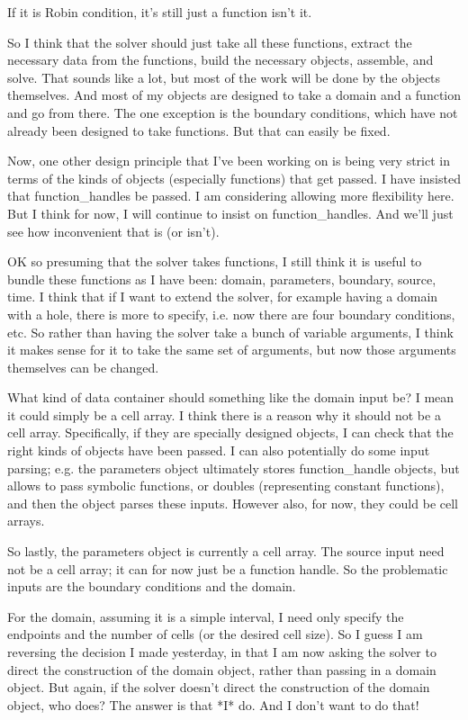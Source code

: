 \documentclass{amsart}
\begin{document}
If it is Robin condition, it's still just a function isn't it. 

So I think that the solver should just take all these functions, extract the
necessary data from the functions, build the necessary objects, assemble, and
solve. That sounds like a lot, but most of the work will be done by the objects
themselves. And most of my objects are designed to take a domain and a function
and go from there. The one exception is the boundary conditions, which have not
already been designed to take functions. But that can easily be fixed. 

Now, one other design principle that I've been working on is being very strict
in terms of the kinds of objects (especially functions) that get passed. I have
insisted that function_handles be passed. I am considering allowing more
flexibility here. But I think for now, I will continue to insist on
function_handles. And we'll just see how inconvenient that is (or isn't). 

OK so presuming that the solver takes functions, I still think it is useful to
bundle these functions as I have been: domain, parameters, boundary, source,
time. I think that if I want to extend the solver, for example having a domain
with a hole, there is more to specify, i.e. now there are four boundary
conditions, etc. So rather than having the solver take a bunch of variable
arguments, I think it makes sense for it to take the same set of arguments, but
now those arguments themselves can be changed. 

What kind of data container should something like the domain input be? I mean
it could simply be a cell array. I think there is a reason why it should not be
a cell array. Specifically, if they are specially designed objects, I can check
that the right kinds of objects have been passed. I can also potentially do
some input parsing; e.g. the parameters object ultimately stores
function_handle objects, but allows to pass symbolic functions, or doubles
(representing constant functions), and then the object parses these inputs.
However also, for now, they could be cell arrays. 

So lastly, the parameters object is currently a cell array. The source input
need not be a cell array; it can for now just be a function handle. So the
problematic inputs are the boundary conditions and the domain. 

For the domain, assuming it is a simple interval, I need only specify the
endpoints and the number of cells (or the desired cell size). So I guess I am
reversing the decision I made yesterday, in that I am now asking the solver to
direct the construction of the domain object, rather than passing in a domain
object. But again, if the solver doesn't direct the construction of the domain
object, who does? The answer is that *I* do. And I don't want to do that! 
\end{document}
